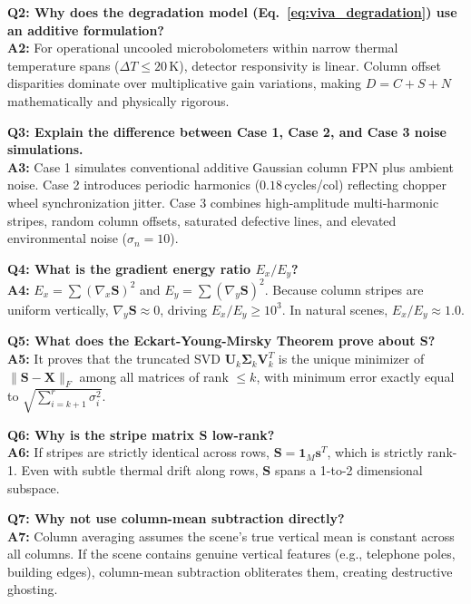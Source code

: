 \documentclass[10pt,conference]{IEEEtran}
\begin{document}
\vspace{0.4em}\noindent\textbf{Q2: Why does the degradation model (Eq.~\ref{eq:viva_degradation}) use an additive formulation?}\\
\textbf{A2:} For operational uncooled microbolometers within narrow thermal temperature spans ($\Delta T \le 20$\,K), detector responsivity is linear. Column offset disparities dominate over multiplicative gain variations, making $D = C + S + N$ mathematically and physically rigorous.

\vspace{0.4em}\noindent\textbf{Q3: Explain the difference between Case 1, Case 2, and Case 3 noise simulations.}\\
\textbf{A3:} Case 1 simulates conventional additive Gaussian column FPN plus ambient noise. Case 2 introduces periodic harmonics ($0.18$\,cycles/col) reflecting chopper wheel synchronization jitter. Case 3 combines high-amplitude multi-harmonic stripes, random column offsets, saturated defective lines, and elevated environmental noise ($\sigma_n = 10$).

\vspace{0.4em}\noindent\textbf{Q4: What is the gradient energy ratio $E_x / E_y$?}\\
\textbf{A4:} $E_x = \sum (\nabla_x \mathbf{S})^2$ and $E_y = \sum (\nabla_y \mathbf{S})^2$. Because column stripes are uniform vertically, $\nabla_y \mathbf{S} \approx 0$, driving $E_x / E_y \ge 10^3$. In natural scenes, $E_x / E_y \approx 1.0$.

\vspace{0.4em}\noindent\textbf{Q5: What does the Eckart-Young-Mirsky Theorem prove about $\mathbf{S}$?}\\
\textbf{A5:} It proves that the truncated SVD $\mathbf{U}_k \mathbf{\Sigma}_k \mathbf{V}_k^T$ is the unique minimizer of $\|\mathbf{S} - \mathbf{X}\|_F$ among all matrices of rank $\le k$, with minimum error exactly equal to $\sqrt{\sum_{i=k+1}^r \sigma_i^2}$.

\vspace{0.4em}\noindent\textbf{Q6: Why is the stripe matrix $\mathbf{S}$ low-rank?}\\
\textbf{A6:} If stripes are strictly identical across rows, $\mathbf{S} = \mathbf{1}_M \mathbf{s}^T$, which is strictly rank-1. Even with subtle thermal drift along rows, $\mathbf{S}$ spans a 1-to-2 dimensional subspace.

\vspace{0.4em}\noindent\textbf{Q7: Why not use column-mean subtraction directly?}\\
\textbf{A7:} Column averaging assumes the scene's true vertical mean is constant across all columns. If the scene contains genuine vertical features (e.g., telephone poles, building edges), column-mean subtraction obliterates them, creating destructive ghosting.
\end{document}
